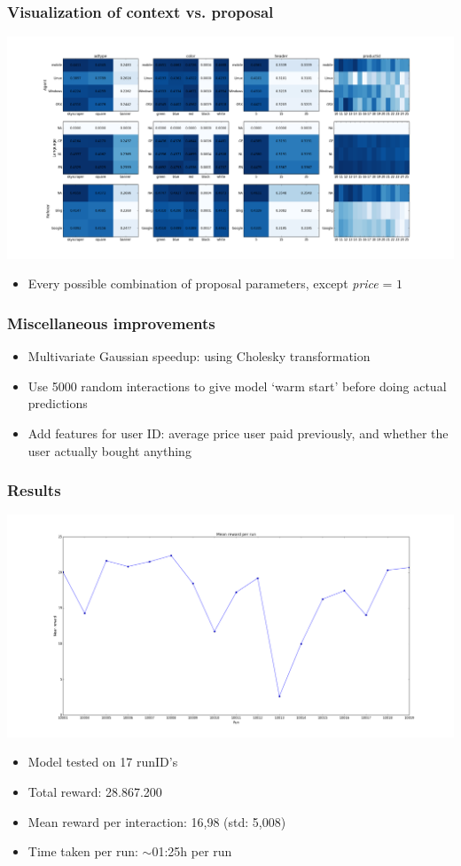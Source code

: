 \documentclass{beamer}
\begin{document}
\begin{frame}
	\frametitle{Visualization of context vs. proposal}
	\includegraphics[width=\textwidth]{viewer.png}
	\begin{itemize}
		\item Every possible combination of proposal parameters, except \emph{price} = $1$
	\end{itemize}
\end{frame}


\begin{frame}
	\frametitle{Miscellaneous improvements}
	\begin{itemize}
		\item<1,4> Multivariate Gaussian speedup: using Cholesky transformation
		\item<2,4> Use 5000 random interactions to give model `warm start' before doing actual predictions
		\item<3,4 | alert@4> Add features for user ID: average price user paid previously, and whether the user actually bought anything
	\end{itemize}
\end{frame}


\begin{frame}
  \frametitle{Results}
  
  \includegraphics[width=\textwidth]{mean_rewards.png}

  \begin{itemize}
    \item Model tested on 17 runID's
    \item Total reward: 28.867.200
   	\item Mean reward per interaction: 16,98 (std: 5,008)‏
    \item Time taken per run: $\sim$01:25h per run
  \end{itemize}
\end{frame}
\end{document}

